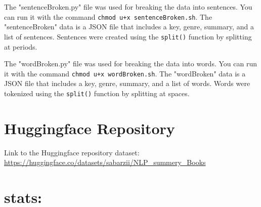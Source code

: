 \documentclass{article}
\begin{document}
The "sentenceBroken.py" file was used for breaking the data into sentences. You can run it with the command \texttt{chmod u+x sentenceBroken.sh}. The "sentenceBroken" data is a JSON file that includes a key, genre, summary, and a list of sentences. Sentences were created using the \texttt{split()} function by splitting at periods.

The "wordBroken.py" file was used for breaking the data into words. You can run it with the command \texttt{chmod u+x wordBroken.sh}. The "wordBroken" data is a JSON file that includes a key, genre, summary, and a list of words. Words were tokenized using the \texttt{split()} function by splitting at spaces.

\section*{Huggingface Repository}
Link to the Huggingface repository dataset: \url{https://huggingface.co/datasets/sabarzii/NLP_summery_Books}

\section*{stats:}
\begin{table}[htbp]
    \centering
\end{table}


\begin{table}[htbp]
    \centering
\end{table}
\end{document}
